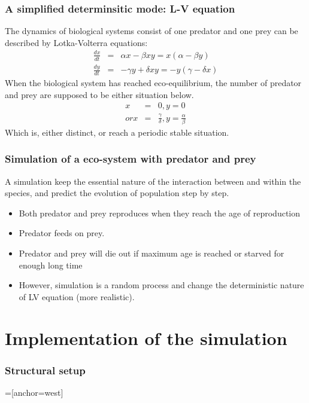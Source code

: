 \documentclass{beamer}
\begin{document}
\frame
{
 \frametitle{A simplified determinsitic mode: L-V equation}
 The dynamics of biological systems consist of one predator and one prey can be described by Lotka-Volterra equations:
 \begin{eqnarray*}
 \frac{dx}{dt} &=& \alpha x - \beta x y = x(\alpha - \beta y) \\
 \frac{dy}{dt} &=& - \gamma y + \delta x y = - y (\gamma - \delta x)
 \end{eqnarray*}
 When the biological system has reached eco-equilibrium, the number of predator and prey are supposed to be either situation below.
 \begin{eqnarray*}
 x &=& 0, y = 0 \\
 or x &=& \frac{\gamma}{\delta}, y = \frac{\alpha}{\beta}
 \end{eqnarray*}
 Which is, either distinct, or reach a periodic stable situation.
}


\frame
{
  \frametitle{Simulation of a eco-system with predator and prey}
  A simulation keep the essential nature of the interaction between and within the species, and predict the evolution of population step by step.
  \begin{itemize}
  \item<1->{Both predator and prey reproduces when they reach the age of reproduction}
  \item<2->{Predator feeds on prey.}
  \item<3->{Predator and prey will die out if maximum age is reached or starved for enough long time}
  \item<4->{However, simulation is a random process and change the deterministic nature of LV equation (more realistic).}
  \end{itemize} 
}

\section{Implementation of the simulation}
\frame
{
  \frametitle{Structural setup}

=[anchor=west]
}
\end{document}
